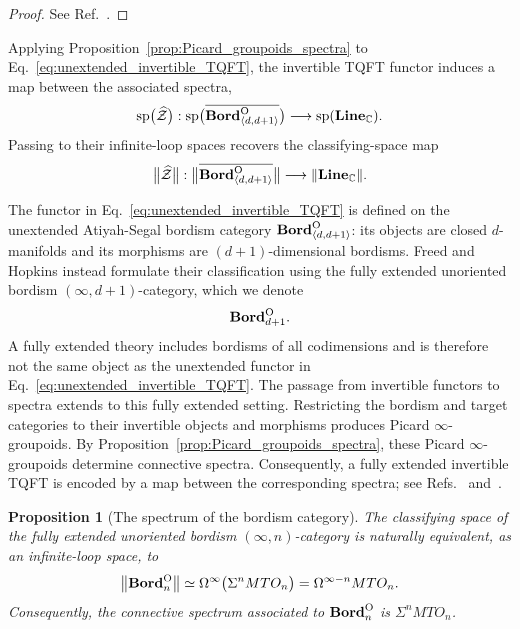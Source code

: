\documentclass[aps,prx,reprint,superscriptaddress,twocolumn,amsmath,amssymb,amsfonts, nofootinbib]{revtex4-2}
\newcommand{\bordd}{{\bf Bord}_{\langle d, d+1\rangle}}
\newcommand{\Line}{{\bf Line}_{\mathbb{C}}}
\theoremstyle{apsstyle}
\newtheorem{proposition}[theorem]{Proposition}
\begin{document}
\begin{proof}
See Ref.~\cite[Sec.~1.1]{SchommerPries2017}.
\end{proof}

\bigskip 

Applying Proposition~\ref{prop:Picard_groupoids_spectra} to
Eq.~\eqref{eq:unextended_invertible_TQFT}, the invertible TQFT functor
induces a map between the associated spectra,
\begin{equation}
    \operatorname{sp}\bigl(\widehat{\mathcal Z}\bigr):
    \operatorname{sp}
    \bigl(\overline{\bordd^{\mathrm O}}\bigr)
    \longrightarrow
    \operatorname{sp}(\Line).
    \label{eq:unextended_TQFT_spectrum_map}
\end{equation}
Passing to their infinite-loop spaces recovers the classifying-space
map
\begin{equation*}
    \bigl\lVert\widehat{\mathcal Z}\bigr\rVert:
    \bigl\lVert\overline{\bordd^{\mathrm O}}\bigr\rVert
    \longrightarrow
    \lVert\Line\rVert.
\end{equation*}

\bigskip 



The functor in Eq.~\eqref{eq:unextended_invertible_TQFT} is defined on the unextended Atiyah-Segal bordism category $\bordd^{\mathrm O}$: its objects are closed $d$-manifolds and its morphisms are $(d+1)$-dimensional bordisms. Freed and Hopkins instead formulate their classification using the fully extended unoriented bordism $(\infty,d+1)$-category, which we denote
\begin{equation*}
    {\bf Bord}_{d+1}^{\mathrm O}.
\end{equation*}
A fully extended theory includes bordisms of all codimensions and is therefore not the same object as the unextended functor in Eq.~\eqref{eq:unextended_invertible_TQFT}. The passage from invertible functors to spectra extends to this fully
extended setting. Restricting the bordism and target categories to
their invertible objects and morphisms produces Picard
$\infty$-groupoids. By Proposition~\ref{prop:Picard_groupoids_spectra}, these Picard
$\infty$-groupoids determine connective spectra. Consequently, a fully
extended invertible TQFT is encoded by a map between the corresponding
spectra; see Refs.~\cite[Sec.~1.1]{SchommerPries2017} and~\cite[Sec.~5.2]{FreedHopkins}.

\bigskip 


\begin{proposition}[The spectrum of the bordism category]
\label{prop:bordism_category_MTO}
The classifying space of the fully extended unoriented bordism
$(\infty,n)$-category is naturally equivalent, as an infinite-loop
space, to
\begin{equation}
    \bigl\lVert{\bf Bord}_{n}^{\mathrm O}\bigr\rVert
    \simeq
    \Omega^\infty\bigl(\Sigma^nMTO_n\bigr)
    =
    \Omega^{\infty-n}MTO_n.
    \label{eq:bordism_category_MTO}
\end{equation}
Consequently, the connective spectrum associated to
${\bf Bord}_{n}^{\mathrm O}$ is $\Sigma^nMTO_n$.
\end{proposition}
\end{document}

